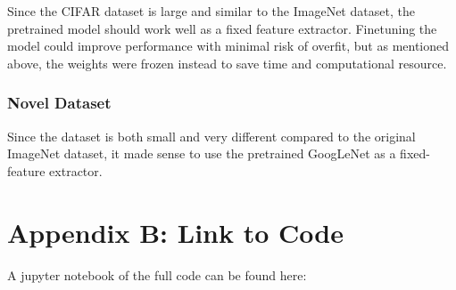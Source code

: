 \documentclass[11pt]{article}
\begin{document}
Since the CIFAR dataset is large and similar to the ImageNet dataset,
the pretrained model should work well as a fixed feature extractor.
Finetuning the model could improve performance with minimal risk of
overfit, but as mentioned above, the weights were frozen instead to save
time and computational resource.

\subsubsection*{Novel Dataset}\label{novel-dataset}

Since the dataset is both small and very different compared to the
original ImageNet dataset, it made sense to use the pretrained GoogLeNet
as a fixed-feature extractor.

\section*{Appendix B: Link to Code}

A jupyter notebook of the full code can be found here:
\url{}


    
    
    
    
\end{document}
